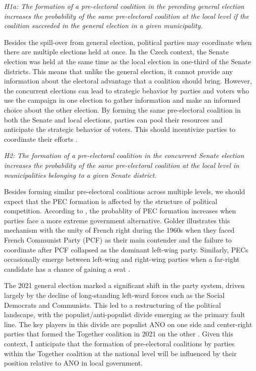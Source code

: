 \documentclass[]{interact}
\theoremstyle{plain}%
\theoremstyle{definition}
\theoremstyle{remark}
\begin{document}
\vspace{12pt}
\textit{H1a: The formation of a pre-electoral coalition in the preceding general election increases the probability of the same pre-electoral coalition at the local level if the coalition succeeded in the general election in a given municipality.\label{hyp:1.1}}
\vspace{12pt}

Besides the spill-over from general election, political parties may coordinate when there are multiple elections held at once. In the Czech context, the Senate election was held at the same time as the local election in one-third of the Senate districts. This means that unlike the general election, it cannot provide any information about the electoral advantage that a coalition should bring. However, the concurrent elections can lead to strategic behavior by parties and voters who use the campaign in one election to gather information and make an informed choice about the other election. By forming the same pre-electoral coalition in both the Senate and local elections, parties can pool their resources and anticipate the strategic behavior of voters. This should incentivize parties to coordinate their efforts \citep{hicken2011}. 

\vspace{12pt}
\textit{H2: The formation of a pre-electoral coalition in the concurrent Senate election increases the probability of the same pre-electoral coalition at the local level in municipalities belonging to a given Senate district.\label{hyp:2}}
\vspace{12pt}

Besides forming similar pre-electoral coalitions across multiple levels, we should expect that the PEC formation is affected by the structure of political competition. 
According to \citet{golder2006}, the probablity of PEC formation increases when parties face a more extreme government alternative. Golder illustrates this mechanism with the unity of French right during the 1960s when they faced French Communist Party (PCF) as their main contender and the failure to coordinate after PCF collapsed as the dominant left-wing party. Similarly, PECs occasionally emerge between left-wing and right-wing parties when a far-right candidate has a chance of gaining a seat \citep[73]{golder2006}. 

The 2021 general election marked a significant shift in the party system, driven largely by the decline of long-standing left-ward forces such as the Social Democrats and Communists. This led to a restructuring of the political landscape, with the populist/anti-populist divide emerging as the primary fault line. The key players in this
divide are populist ANO on one side and center-right parties that formed the Together coalition in 2021 on the other \citep{havlik2022}. Given this context, I anticipate that the formation of pre-electoral coalitions by parties within the Together coalition at the national level will be influenced by their position relative to ANO in local government.
\end{document}
